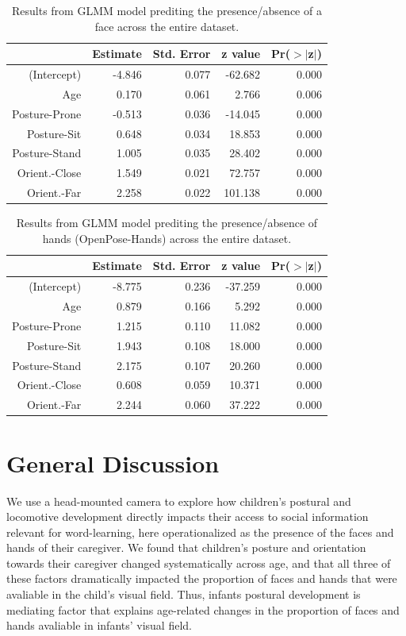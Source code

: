\documentclass[10pt, letterpaper]{article}
\begin{document}
\begin{table}[H]
\centering
\begin{tabular}{rrrrr}
  \hline
 & Estimate & Std. Error & z value & Pr($>$$|$z$|$) \\ 
  \hline
(Intercept) & -4.846 & 0.077 & -62.682 & 0.000 \\ 
  Age & 0.170 & 0.061 & 2.766 & 0.006 \\ 
  Posture-Prone & -0.513 & 0.036 & -14.045 & 0.000 \\ 
  Posture-Sit & 0.648 & 0.034 & 18.853 & 0.000 \\ 
  Posture-Stand & 1.005 & 0.035 & 28.402 & 0.000 \\ 
  Orient.-Close & 1.549 & 0.021 & 72.757 & 0.000 \\ 
  Orient.-Far & 2.258 & 0.022 & 101.138 & 0.000 \\ 
   \hline
\end{tabular}
\caption{Results from GLMM model prediting the presence/absence of a face across  the entire dataset.} 
\end{table}

\begin{table}[H]
\centering
\begin{tabular}{rrrrr}
  \hline
 & Estimate & Std. Error & z value & Pr($>$$|$z$|$) \\ 
  \hline
(Intercept) & -8.775 & 0.236 & -37.259 & 0.000 \\ 
  Age & 0.879 & 0.166 & 5.292 & 0.000 \\ 
  Posture-Prone  & 1.215 & 0.110 & 11.082 & 0.000 \\ 
  Posture-Sit & 1.943 & 0.108 & 18.000 & 0.000 \\ 
  Posture-Stand  & 2.175 & 0.107 & 20.260 & 0.000 \\ 
  Orient.-Close  & 0.608 & 0.059 & 10.371 & 0.000 \\ 
  Orient.-Far & 2.244 & 0.060 & 37.222 & 0.000 \\ 
   \hline
\end{tabular}
\caption{Results from GLMM model prediting the presence/absence of hands (OpenPose-Hands) across the entire dataset.} 
\end{table}

\section{General Discussion}\label{general-discussion}

We use a head-mounted camera to explore how children's postural and
locomotive development directly impacts their access to social
information relevant for word-learning, here operationalized as the
presence of the faces and hands of their caregiver. We found that
children's posture and orientation towards their caregiver changed
systematically across age, and that all three of these factors
dramatically impacted the proportion of faces and hands that were
avaliable in the child's visual field. Thus, infants postural
development is mediating factor that explains age-related changes in the
proportion of faces and hands avaliable in infants' visual field.
\end{document}
